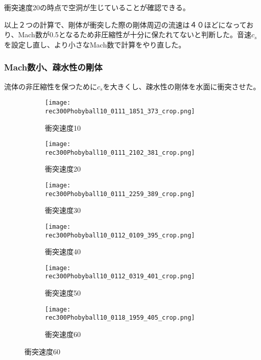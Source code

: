 \documentclass[]{jsarticle}
\begin{document}

衝突速度20の時点で空洞が生じていることが確認できる。

以上２つの計算で、剛体が衝突した際の剛体周辺の流速は４０ほどになっており、Mach数が0.5となるため非圧縮性が十分に保たれてないと判断した。音速$c_s$を設定し直し、より小さなMach数で計算をやり直した。


\subsubsection{Mach数小、疎水性の剛体}
流体の非圧縮性を保つために$c_s$を大きくし、疎水性の剛体を水面に衝突させた。
\begin{figure}[H]
  \centering
\begin{subfigure}{0.3\columnwidth}
  \centering
  \texttt{[image: rec300Phobyball10\_0111\_1851\_373\_crop.png]}
  \caption{衝突速度10}
  \label{fig:MSPhobyvel10}
\end{subfigure}
\begin{subfigure}{0.3\columnwidth}
  \centering
  \texttt{[image: rec300Phobyball10\_0111\_2102\_381\_crop.png]}
  \caption{衝突速度20}
  \label{fig:MSPhobyvel20}
\end{subfigure}
\begin{subfigure}{0.3\columnwidth}
  \centering
  \texttt{[image: rec300Phobyball10\_0111\_2259\_389\_crop.png]}
  \caption{衝突速度30}
  \label{fig:MSPhobyvel30}
\end{subfigure}
\begin{subfigure}{0.3\columnwidth}
  \centering
  \texttt{[image: rec300Phobyball10\_0112\_0109\_395\_crop.png]}
  \caption{衝突速度40}
  \label{fig:MSPhobyvel40}
\end{subfigure}
\begin{subfigure}{0.3\columnwidth}
  \centering
  \texttt{[image: rec300Phobyball10\_0112\_0319\_401\_crop.png]}
  \caption{衝突速度50}
  \label{fig:MSPhobyvel50}
\end{subfigure}
\begin{subfigure}{0.3\columnwidth}
  \centering
  \texttt{[image: rec300Phobyball10\_0118\_1959\_405\_crop.png]}
  \caption{衝突速度60}
  \label{fig:MSPhobyvel60}
\end{subfigure}
\end{figure}
\end{document}
